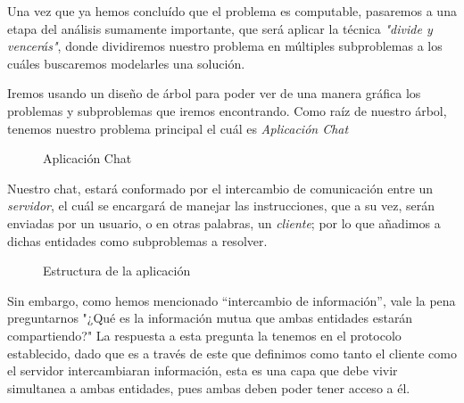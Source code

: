 \documentclass[10pt,letterpaper]{report}
\begin{document}
\vspace{0.5cm}

\noindent Una vez que ya hemos concluído que el problema es computable, pasaremos a una etapa del análisis sumamente importante, que será aplicar la técnica \textit{"divide y vencerás"}, donde dividiremos nuestro problema en múltiples subproblemas a los cuáles buscaremos modelarles una solución.

\noindent Iremos usando un diseño de árbol para poder ver de una manera gráfica los problemas y subproblemas que iremos encontrando. Como raíz de nuestro árbol, tenemos nuestro problema principal el cuál es \textit{Aplicación Chat}

\vspace{0.5cm}
\begin{figure}[h]
\centering


\caption{Aplicación Chat}
\label{fig:aplicacion-chat}
\end{figure}

\vspace{0.5cm}

\noindent Nuestro chat, estará conformado por el intercambio de comunicación entre un \textit{servidor}, el cuál se encargará de manejar las instrucciones, que a su vez, serán enviadas por un usuario, o en otras palabras, un \textit{cliente}; por lo que añadimos a dichas entidades como subproblemas a resolver.

\begin{figure}[h]
\centering


\caption{Estructura de la aplicación}
\label{fig:estructura-aplicacion}
\end{figure}

\vspace{0.5cm}

\noindent Sin embargo, como hemos mencionado ``intercambio de información'', vale la pena preguntarnos "¿Qué es la información mutua que ambas entidades estarán compartiendo?" La respuesta a esta pregunta la tenemos en el protocolo establecido, dado que es a través de este que definimos como tanto el cliente como el servidor intercambiaran información, esta es una capa que debe vivir simultanea a ambas entidades, pues ambas deben poder tener acceso a él.
\end{document}
